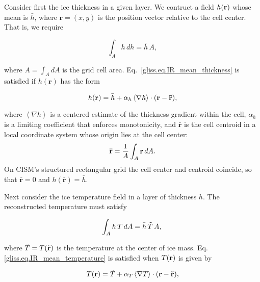 Consider first the ice thickness in a given layer. We contruct a field
$h({\bf{r}})$ whose mean is $\bar{h}$, where $\mathbf{r} = (x,y)$ 
is the position vector relative to the cell center. 
That is, we require

\begin{equation}
  \label{gliss.eq.IR_mean_thickness}
  \int_A h \, dh = {\bar h} \, A,
\end{equation}

\noindent
where $A=\int_A dA$ is the grid cell area.
Eq.~\eqref{gliss.eq.IR_mean_thickness} is satisfied if $h(\mathbf{r})$ has the form

\begin{equation}
  \label{gliss.eq.IR_recon_thickness}
  h({\bf r}) = \bar{h} + \alpha_h \left<\nabla h\right> \cdot (\mathbf{r}-\mathbf{\bar{r}}),
\end{equation}

\noindent
where $\left<\nabla h\right>$ is a centered estimate of the thickness
gradient within the cell, $\alpha_h$ is a limiting coefficient that
enforces monotonicity, and $\mathbf{\bar{r}}$ is the cell centroid
in a local coordinate system whose origin lies at the cell center:
\[{\bf \bar{r}} = \frac{1}{A} \int_A {\bf r} \, dA.\]
On CISM's structured rectangular grid the cell center and centroid
coincide, so that $\mathbf{\bar{r}} = 0$ and
$h(\mathbf{\bar{r}}) = \bar h$.


Next consider the ice temperature field in a layer of thickness $h$. 
The reconstructed temperature must satisfy

\begin{equation}
  \label{gliss.eq.IR_mean_temperature}
  \int_A h \, T \, dA = \bar{h} \, \tilde{T} \, A,    \\
\end{equation}

\noindent
where $\tilde{T} = T(\tilde{\bf r})$ is the temperature at the center of ice mass.
Eq. \eqref{gliss.eq.IR_mean_temperature} is satisfied when $T({\bf r})$ is given by

\begin{equation}
  \label{gliss.eq.IR_recon_temperature}
  T({\bf r}) = \tilde{T} + \alpha_T \left<\nabla T\right> \cdot
                                     ({\bf r}-{\bf \tilde{r}}),
\end{equation}

